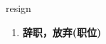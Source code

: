 
\begin{frame}
{\huge resign}
\begin{center}
\begin{enumerate}\Large
  \item \textbf{辞职，放弃(职位)}
\end{enumerate}
\end{center}
\end{frame}
